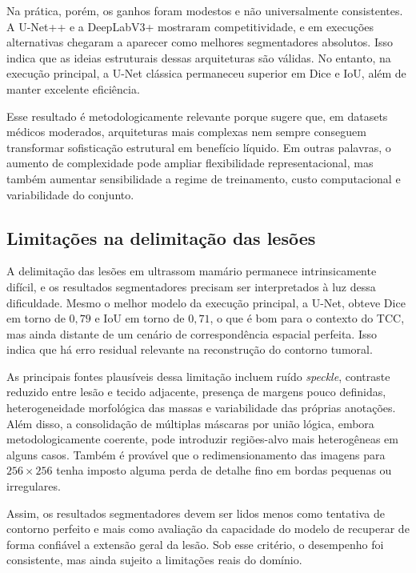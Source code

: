 \documentclass[tcc,capa]{texufpel}
\begin{document}
Na prática, porém, os ganhos foram modestos e não universalmente consistentes. A U-Net++ e a DeepLabV3+ mostraram competitividade, e em execuções alternativas chegaram a aparecer como melhores segmentadores absolutos. Isso indica que as ideias estruturais dessas arquiteturas são válidas. No entanto, na execução principal, a U-Net clássica permaneceu superior em Dice e IoU, além de manter excelente eficiência.

Esse resultado é metodologicamente relevante porque sugere que, em datasets médicos moderados, arquiteturas mais complexas nem sempre conseguem transformar sofisticação estrutural em benefício líquido. Em outras palavras, o aumento de complexidade pode ampliar flexibilidade representacional, mas também aumentar sensibilidade a regime de treinamento, custo computacional e variabilidade do conjunto.

\subsection{Limitações na delimitação das lesões}

A delimitação das lesões em ultrassom mamário permanece intrinsicamente difícil, e os resultados segmentadores precisam ser interpretados à luz dessa dificuldade. Mesmo o melhor modelo da execução principal, a U-Net, obteve Dice em torno de \(0{,}79\) e IoU em torno de \(0{,}71\), o que é bom para o contexto do TCC, mas ainda distante de um cenário de correspondência espacial perfeita. Isso indica que há erro residual relevante na reconstrução do contorno tumoral.

As principais fontes plausíveis dessa limitação incluem ruído \textit{speckle}, contraste reduzido entre lesão e tecido adjacente, presença de margens pouco definidas, heterogeneidade morfológica das massas e variabilidade das próprias anotações. Além disso, a consolidação de múltiplas máscaras por união lógica, embora metodologicamente coerente, pode introduzir regiões-alvo mais heterogêneas em alguns casos. Também é provável que o redimensionamento das imagens para \(256\times256\) tenha imposto alguma perda de detalhe fino em bordas pequenas ou irregulares.

Assim, os resultados segmentadores devem ser lidos menos como tentativa de contorno perfeito e mais como avaliação da capacidade do modelo de recuperar de forma confiável a extensão geral da lesão. Sob esse critério, o desempenho foi consistente, mas ainda sujeito a limitações reais do domínio.
\end{document}
